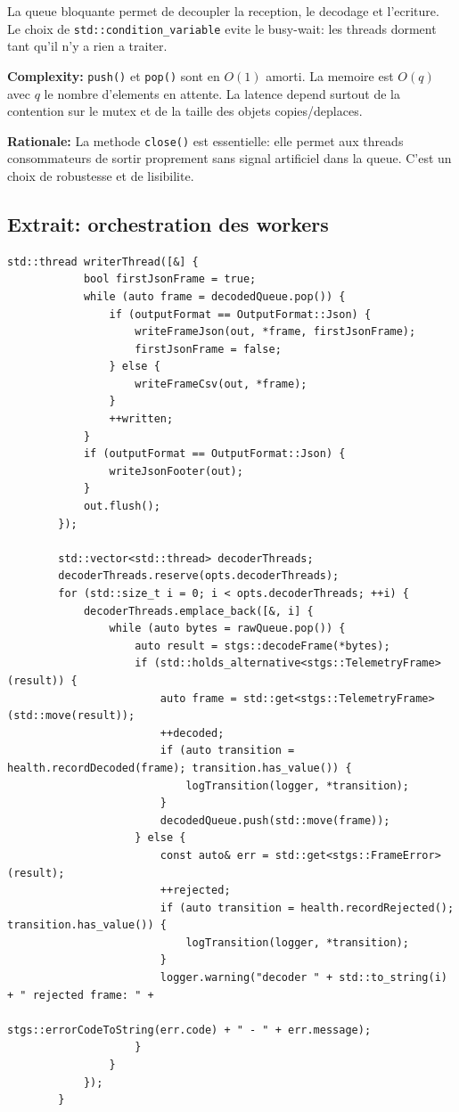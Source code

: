 \documentclass[10pt,a4paper]{article}
\newcommand{\complexity}[1]{\textbf{Complexity:} #1}
\newcommand{\rationale}[1]{\textbf{Rationale:} #1}
\begin{document}
La queue bloquante permet de decoupler la reception, le decodage et l'ecriture. Le choix de \texttt{std::condition\_variable} evite le busy-wait: les threads dorment tant qu'il n'y a rien a traiter.

\complexity{\texttt{push()} et \texttt{pop()} sont en $O(1)$ amorti. La memoire est $O(q)$ avec $q$ le nombre d'elements en attente. La latence depend surtout de la contention sur le mutex et de la taille des objets copies/deplaces.}

\rationale{La methode \texttt{close()} est essentielle: elle permet aux threads consommateurs de sortir proprement sans signal artificiel dans la queue. C'est un choix de robustesse et de lisibilite.}

\subsection{Extrait: orchestration des workers}
\begin{lstlisting}[caption={Workers de decodage et thread d ecriture}]
        std::thread writerThread([&] {
            bool firstJsonFrame = true;
            while (auto frame = decodedQueue.pop()) {
                if (outputFormat == OutputFormat::Json) {
                    writeFrameJson(out, *frame, firstJsonFrame);
                    firstJsonFrame = false;
                } else {
                    writeFrameCsv(out, *frame);
                }
                ++written;
            }
            if (outputFormat == OutputFormat::Json) {
                writeJsonFooter(out);
            }
            out.flush();
        });

        std::vector<std::thread> decoderThreads;
        decoderThreads.reserve(opts.decoderThreads);
        for (std::size_t i = 0; i < opts.decoderThreads; ++i) {
            decoderThreads.emplace_back([&, i] {
                while (auto bytes = rawQueue.pop()) {
                    auto result = stgs::decodeFrame(*bytes);
                    if (std::holds_alternative<stgs::TelemetryFrame>(result)) {
                        auto frame = std::get<stgs::TelemetryFrame>(std::move(result));
                        ++decoded;
                        if (auto transition = health.recordDecoded(frame); transition.has_value()) {
                            logTransition(logger, *transition);
                        }
                        decodedQueue.push(std::move(frame));
                    } else {
                        const auto& err = std::get<stgs::FrameError>(result);
                        ++rejected;
                        if (auto transition = health.recordRejected(); transition.has_value()) {
                            logTransition(logger, *transition);
                        }
                        logger.warning("decoder " + std::to_string(i) + " rejected frame: " +
                                       stgs::errorCodeToString(err.code) + " - " + err.message);
                    }
                }
            });
        }
\end{lstlisting}
\end{document}
